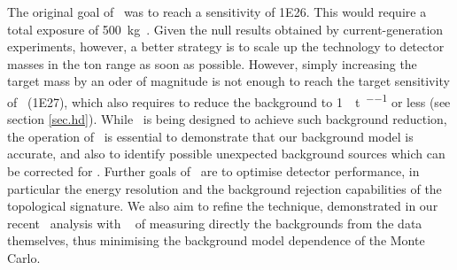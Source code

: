 The original goal of \Next\ was to reach a sensitivity of \SI{1E26}{\yr}. This would require a total exposure of \SI{500}{\kg\yr}. Given the null results obtained 
by current-generation experiments, however, a better strategy is to scale up the technology to detector masses in the ton range as soon as possible. However, simply increasing the target mass by an oder of magnitude is not enough to reach the target sensitivity of \NHD\ (\SI{1E27}{\yr}), which also requires to reduce the background to \SI{1}{\ev\per\tonne\per\yr} or less (see section \ref{sec.hd}). While \NHD\ is being designed to achieve such background reduction, the operation of \Next\ is essential to demonstrate that our background model is accurate, and also to identify possible unexpected background sources which can be corrected for \NHD. Further goals of \Next\ are to optimise detector performance, in particular the energy resolution and the background rejection capabilities of the topological signature. We also aim to refine the technique, demonstrated in our recent \bbtnu\ analysis with \NEW\ \cite{nextcollaboration2021measurement} of measuring directly the backgrounds from the data themselves, thus minimising the background model dependence of the Monte Carlo.  





